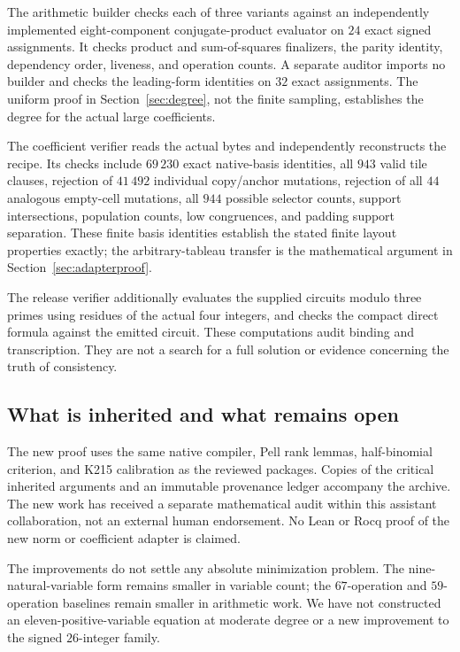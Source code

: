 \documentclass[11pt,a4paper]{article}
\theoremstyle{remark}\newtheorem{remark}[theorem]{Remark}
\begin{document}
The arithmetic builder checks each of three variants against an independently
implemented eight-component conjugate-product evaluator on $24$ exact signed
assignments. It checks product and sum-of-squares finalizers, the parity
identity, dependency order, liveness, and operation counts. A separate
auditor imports no builder and checks the leading-form identities on $32$
exact assignments. The uniform proof in Section~\ref{sec:degree}, not the
finite sampling, establishes the degree for the actual large coefficients.

The coefficient verifier reads the actual bytes and independently
reconstructs the recipe. Its checks include $69\,230$ exact native-basis
identities, all $943$ valid tile clauses, rejection of $41\,492$ individual
copy/anchor mutations, rejection of all $44$ analogous empty-cell
mutations, all $944$ possible selector counts, support intersections,
population counts, low congruences, and padding support separation.
These finite basis identities establish the stated finite layout properties
exactly; the arbitrary-tableau transfer is the mathematical argument in
Section~\ref{sec:adapterproof}.

The release verifier additionally evaluates the supplied circuits modulo
three primes using residues of the actual four integers, and checks the
compact direct formula against the emitted circuit. These computations
audit binding and transcription. They are not a search for a full solution
or evidence concerning the truth of consistency.

\subsection{What is inherited and what remains open}

The new proof uses the same native compiler, Pell rank lemmas, half-binomial
criterion, and K215 calibration as the reviewed packages. Copies of the
critical inherited arguments and an immutable provenance ledger accompany
the archive. The new work has received a separate mathematical audit within
this assistant collaboration, not an external human endorsement.
No Lean or Rocq proof of the new norm or coefficient adapter is claimed.

The improvements do not settle any absolute minimization problem. The
nine-natural-variable form remains smaller in variable count; the
$67$-operation and $59$-operation baselines remain smaller in arithmetic
work. We have not constructed an eleven-positive-variable equation at
moderate degree or a new improvement to the signed $26$-integer family.
\end{document}
